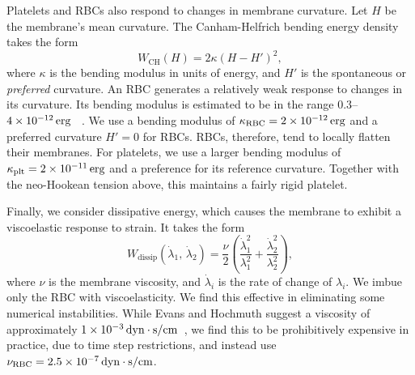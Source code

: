 Platelets and RBCs also respond to changes in membrane curvature. Let $H$ be the
membrane's mean curvature. The Canham-Helfrich bending energy density takes the form~%
\cite{Canham:1970wx}
\begin{equation}\label{eq:bending-energy}
    W_\text{CH}(H) = 2\kappa (H-H')^2,
\end{equation}
where $\kappa$ is the bending modulus in units of energy, and $H'$ is the spontaneous or
\emph{preferred} curvature. An RBC generates a relatively weak response to changes in its
curvature. Its bending modulus is estimated to be in the range $0.3$--$4\sci{-12}\erg$~%
\cite{Mohandas:1994tg}. We use a bending modulus of $\rbc\kappa = 2\sci{-12}\erg$ and a
preferred curvature $H' = 0$ for RBCs. RBCs, therefore, tend to locally flatten their
membranes. For platelets, we use a larger bending modulus of $\plt\kappa=2\sci{-11}\erg$
and a preference for its reference curvature. Together with the neo-Hookean tension
above, this maintains a fairly rigid platelet.

Finally, we consider dissipative energy, which causes the membrane to exhibit a
viscoelastic response to strain. It takes the form~\cite{Rangamani:2012hi}
\begin{equation}\label{eq:dissip-energy}
    W_\text{dissip}(\dot{\lambda}_1,\,\dot{\lambda}_2) = \frac{\nu}{2}\left(\frac{\dot{\lambda}_1^2}{\lambda_1^2} + \frac{\dot{\lambda}_2^2}{\lambda_2^2}\right),
\end{equation}
where $\nu$ is the membrane viscosity, and $\dot{\lambda}_i$ is the rate of change of
$\lambda_i$. We imbue only the RBC with viscoelasticity. We find this effective in
eliminating some numerical instabilities. While Evans and Hochmuth suggest a viscosity of
approximately $1\sci{-3}\dynsecpercm$~\cite{Evans:1976tx}, we find this to be
prohibitively expensive in practice, due to time step restrictions, and instead use
$\rbc\nu = 2.5\sci{-7}\dynsecpercm$.

